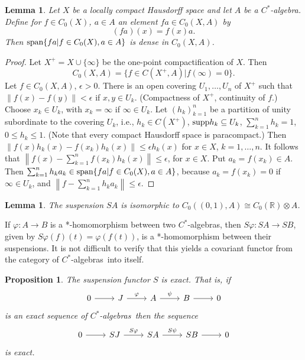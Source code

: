 \documentclass{book}
\newtheorem{lemma}[definition]{Lemma}
\newtheorem{proposition}[definition]{Proposition}
\def\cstar{\(C^*\)-algebra}
\def\cstars{\(C^*\)-algebras}
\begin{document}
\begin{lemma}
  Let \(X\) be a locally compact Hausdorff space and let \(A\) be a \cstar. Define for \(f\in C_0(X)\), \(a\in A\) an element
  \(fa\in C_0(X,A)\) by
  \[
    (fa)(x)=f(x)a.
  \]
  Then \(\textnormal{span}\{fa| f\in C_0(X), a\in A\}\) is dense in \(C_0(X,A)\).
\end{lemma}
\begin{proof}
  Let \(X^+=X\cup\{\infty\}\) be the one-point compactification of \(X\). Then 
  \[
    C_0(X,A)=\{f\in C(X^+,A)|f(\infty)=0\}.
  \]
  Let \(f\in C_0(X,A)\), \(\epsilon>0\). There is an open covering \(U_1,\ldots, U_n\) of \(X^+\) such that \(\left\|f(x)-f(y)\right\|<\epsilon\) if \(x,y\in U_k\).
  (Compactness of \(X^+\), continuity of \(f\).) Choose \(x_k\in U_k\), with \(x_k=\infty\) if \(\infty\in U_k\).
  Let \({(h_k)}_{k=1}^n\) be a partition of unity subordinate to the covering \(U_k\), i.e., 
  \(h_k\in C(X^+)\), \(\textnormal{supp} h_k\subseteq U_k\), \(\sum_{k=1}^n h_k=1\), \(0\leq h_k\leq 1\).
  (Note that every compact Hausdorff space is paracompact.) Then \(\left\|f(x)h_k(x)-f(x_k)h_k(x)\right\|\leq \epsilon h_k(x)\)
  for \(x\in X\), \(k=1,\ldots, n\). It follows that \(\left\|f(x)-\sum_{k=1}^n f(x_k)h_k(x) \right\|\leq\epsilon\), for \(x\in X\).
  Put \(a_k=f(x_k)\in A\). Then \(\sum_{k=1}^n h_k a_k\in \textnormal{span}\{fa|f\in C_0(X),a\in A\}\), because
  \(a_k=f(x_k)=0\) if \(\infty \in U_k\), and \(\left\|f-\sum_{k=1}^n h_k a_k\right\|\leq \epsilon\).
\end{proof}
\begin{lemma}
  The suspension \(S A\) is isomorphic to \(C_0((0,1),A)\cong C_0(\mathbb{R})\otimes A\).
\end{lemma}
If \(\varphi:A\rightarrow B\) is a *-homomorphism between two \cstars, then \(S\varphi:S A\rightarrow S B\), given by \(S\varphi (f)(t)=\varphi(f(t))\), is a *-homomorphism between their suspensions.
It is not difficult to verify that this yields a covariant functor from the category of \cstars\ into itself.
\begin{proposition}
  The suspension functor \(S\) is exact. That is, if 
  \[
    \begin{tikzcd}
      0\arrow[r]&J \arrow[r,"\varphi"]&A\arrow[r,"\psi"]&B\arrow[r]&0
    \end{tikzcd}  
  \]
  is an exact sequence of \cstars\ then the sequence
  \[
    \begin{tikzcd}
      0\arrow[r]&S J \arrow[r,"S\varphi"]&S A\arrow[r,"S\psi"]&S B\arrow[r]&0
    \end{tikzcd}  
  \]
  is exact.
\end{proposition}
\end{document}
